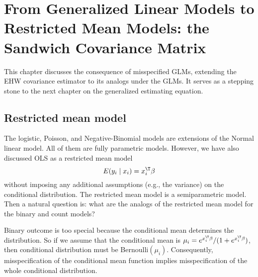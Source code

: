  
\chapter{From Generalized Linear Models to Restricted Mean Models: the Sandwich Covariance Matrix}\label{chapter::sandwich}


This chapter discusses the consequence of misspecified GLMs, extending the EHW covariance estimator to its analogs under the GLMs. It serves as a stepping stone to the next chapter on the generalized estimating equation. 



 


\section{Restricted mean model}
\label{sec::rmm-estimation-equation}

The logistic, Poisson, and Negative-Binomial models are extensions of
the Normal linear model. All of them are fully parametric models.
However, we have also discussed OLS as a restricted mean model
\[
E(y_{i}\mid x_{i})=x_{i}^{\T}\beta
\]
without imposing any additional assumptions (e.g., the variance) on
the conditional distribution. The restricted
mean model is a semiparametric model. Then a natural question is: what
are the analogs of the restricted mean model for the binary and count models? 

Binary outcome is too special because the conditional mean determines
the distribution. So if we assume that the conditional mean is $\mu_{i}=e^{x_{i}^{\T}\beta}/(1+e^{x_{i}^{\T}\beta})$,
then conditional distribution must be Bernoulli$(\mu_{i})$. Consequently, misspecification of the conditional mean function implies misspecification of the whole conditional distribution. 

